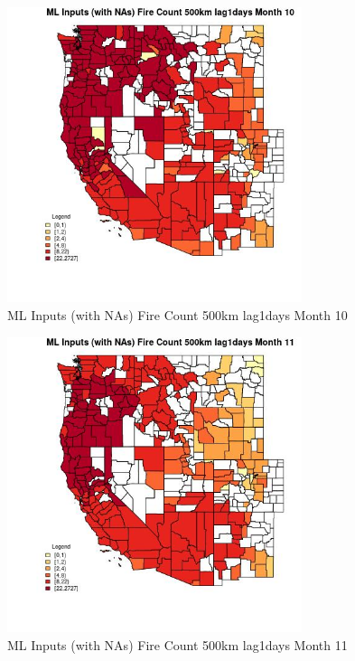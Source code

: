 \begin{figure} 
\centering  
\includegraphics[width=0.77\textwidth]{Code_Outputs/Report_ML_input_PM25_Step4_part_f_de_duplicated_aveswNAs_CountyFire_Count_500km_lag1daysmedianMonth10.jpg} 
\caption{\label{fig:Report_ML_input_PM25_Step4_part_f_de_duplicated_aveswNAsCountyFire_Count_500km_lag1daysmedianMonth10}ML Inputs (with NAs) Fire Count 500km lag1days Month 10} 
\end{figure} 
 

\begin{figure} 
\centering  
\includegraphics[width=0.77\textwidth]{Code_Outputs/Report_ML_input_PM25_Step4_part_f_de_duplicated_aveswNAs_CountyFire_Count_500km_lag1daysmedianMonth11.jpg} 
\caption{\label{fig:Report_ML_input_PM25_Step4_part_f_de_duplicated_aveswNAsCountyFire_Count_500km_lag1daysmedianMonth11}ML Inputs (with NAs) Fire Count 500km lag1days Month 11} 
\end{figure} 
 

